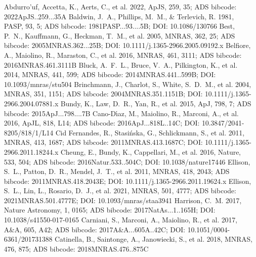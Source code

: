 \documentclass[twocolumn]{aastex631}
\begin{document}
\begin{thebibliography}{}
 Abdurro'uf, Accetta, K., Aerts, C., et al. 2022, ApJS, 259, 35; ADS bibcode: 2022ApJS..259...35A
 Baldwin, J.~A., Phillips, M.~M., \& Terlevich, R. 1981, PASP, 93, 5; ADS bibcode: 1981PASP...93....5B; DOI: 10.1086/130766
 Best, P.~N., Kauffmann, G., Heckman, T.~M., et al. 2005, MNRAS, 362, 25; ADS bibcode: 2005MNRAS.362...25B; DOI: 10.1111/j.1365-2966.2005.09192.x
 Belfiore, A., Maiolino, R., Maraston, C., et al. 2016, MNRAS, 461, 3111; ADS bibcode: 2016MNRAS.461.3111B
 Bluck, A.~F.~L., Bruce, V.~A., Pilkington, K., et al. 2014, MNRAS, 441, 599; ADS bibcode: 2014MNRAS.441..599B; DOI: 10.1093/mnras/stu504
 Brinchmann, J., Charlot, S., White, S.~D.~M., et al. 2004, MNRAS, 351, 1151; ADS bibcode: 2004MNRAS.351.1151B; DOI: 10.1111/j.1365-2966.2004.07881.x
 Bundy, K., Law, D.~R., Yan, R., et al. 2015, ApJ, 798, 7; ADS bibcode: 2015ApJ...798....7B
 Cano-D\'{\i}az, M., Maiolino, R., Marconi, A., et al. 2016, ApJL, 818, L14; ADS bibcode: 2016ApJ...818L..14C; DOI: 10.3847/2041-8205/818/1/L14
 Cid Fernandes, R., Stasi{\'n}ska, G., Schlickmann, S., et al. 2011, MNRAS, 413, 1687; ADS bibcode: 2011MNRAS.413.1687C; DOI: 10.1111/j.1365-2966.2011.18244.x
 Cheung, E., Bundy, K., Cappellari, M., et al. 2016, Nature, 533, 504; ADS bibcode: 2016Natur.533..504C; DOI: 10.1038/nature17446
 Ellison, S.~L., Patton, D.~R., Mendel, J.~T., et al. 2011, MNRAS, 418, 2043; ADS bibcode: 2011MNRAS.418.2043E; DOI: 10.1111/j.1365-2966.2011.19624.x
 Ellison, S.~L., Lin, L., Rosario, D.~J., et al. 2021, MNRAS, 501, 4777; ADS bibcode: 2021MNRAS.501.4777E; DOI: 10.1093/mnras/staa3941
 Harrison, C.~M. 2017, Nature Astronomy, 1, 0165; ADS bibcode: 2017NatAs...1..165H; DOI: 10.1038/s41550-017-0165
 Carniani, S., Marconi, A., Maiolino, R., et al. 2017, A\&A, 605, A42; ADS bibcode: 2017A\&A...605A..42C; DOI: 10.1051/0004-6361/201731388
 Catinella, B., Saintonge, A., Janowiecki, S., et al. 2018, MNRAS, 476, 875; ADS bibcode: 2018MNRAS.476..875C

\end{thebibliography}
\end{document}
